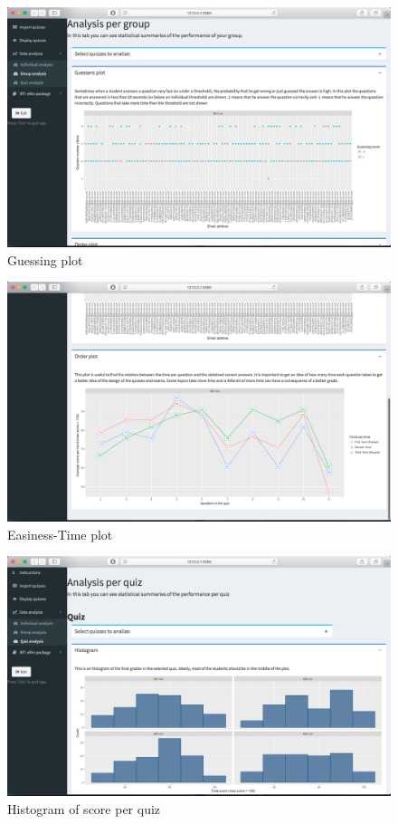\begin{figure}[ht!]
\centering
\includegraphics[width=\linewidth]{img/d_4_1.png}
\caption{Guessing plot}
\label{img:d_4_1}
\end{figure}
\begin{figure}[ht!]
\centering
\includegraphics[width=\linewidth]{img/d_4_2.png}
\caption{Easiness-Time plot}
\label{img:d_4_2}
\end{figure}
\begin{figure}[ht!]
\centering
\includegraphics[width=\linewidth]{img/d_5_1.png}
\caption{Histogram of score per quiz}
\label{img:d_5_1}
\end{figure}
